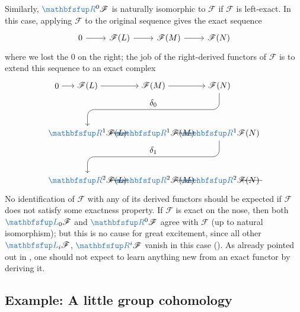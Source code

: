 Similarly, $\categ{R}^0\mathscr{F}$ is naturally isomorphic to
$\mathscr{F}$ if $\mathscr{F}$ is left-exact. In this case, applying
$\mathscr{F}$ to the original sequence gives the exact sequence
\[\begin{tikzcd}
    0 \arrow[r] & \mathscr{F}(L) \arrow[r] & \mathscr{F}(M) \arrow[r]
    & \mathscr{F}(N)
  \end{tikzcd}\] where we lost the $0$ on the right; the job of the
right-derived functors of $\mathscr{F}$ is to extend this sequence to
an exact complex
\[
  \begin{tikzpicture}[baseline=(current bounding box.center)]
    \node (zero) at (-1.3,4)
    {$0$}; \node (FL) at (0,4)
    {$\mathscr{F}(L)$}; \node (FM) at (2.8,4)
    {$\mathscr{F}(M)$}; \node (FN) at (5.6,4)
    {$\mathscr{F}(N)$}; \node (R1L) at (0,2)
    {$\categ{R}^1\mathscr{F}(L)$}; \node (R1M) at (2.8,2)
    {$\categ{R}^1\mathscr{F}(M)$}; \node (R1N) at (5.6,2)
    {$\categ{R}^1\mathscr{F}(N)$}; \node (R2L) at (0,0)
    {$\categ{R}^2\mathscr{F}(L)$}; \node (R2M) at (2.8,0)
    {$\categ{R}^2\mathscr{F}(M)$}; \node (R2N) at (5.6,0)
    {$\categ{R}^2\mathscr{F}(N)$}; \node (dots) at (6.9,0)
    {$\dots$}; \draw[->] (zero) -- (FL); \draw[->] (FL) -- (FM);
    \draw[->] (FM) -- (FN); \draw[->] (R1L) -- (R1M); \draw[->] (R1M)
    -- (R1N); \draw[->] (R2L) -- (R2M); \draw[->] (R2M) -- (R2N);
    \draw[->] (R2N) -- (dots); \draw[->, rounded corners=8pt]
    (FN.south) -- (5.6,3) -- node[above]
    {$\delta_0$} (0,3) -- (R1L.north); \draw[->, rounded corners=8pt]
    (R1N.south) -- (5.6,1) -- node[above]
    {$\delta_1$} (0,1) -- (R2L.north);
  \end{tikzpicture}
\]
No identification of $\mathscr{F}$ with any of its derived functors
should be expected if $\mathscr{F}$ does not satisfy some exactness
property. If $\mathscr{F}$ is exact on the nose, then both
$\categ{L}_0\mathscr{F}$ and $\categ{R}^0\mathscr{F}$ agree with
$\mathscr{F}$ (up to natural isomorphism); but this is no cause for
great excitement, since all other $\categ{L}_i\mathscr{F}$,
$\categ{R}^i\mathscr{F}$ vanish in this case
(). As
already pointed out in , one should not
expect to learn anything new from an exact functor by deriving it.

\subsection{Example: A little group cohomology}
\label{subsec:homol:example-a-little-group-cohomology}

